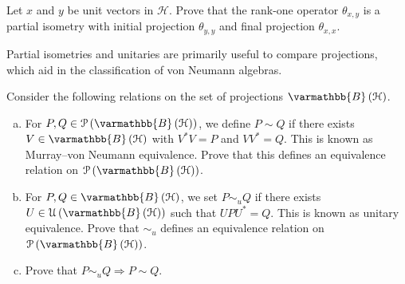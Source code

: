 \documentclass[10pt]{mypackage}
\renewcommand*{\mathbb}[1]{\varmathbb{#1}}
\newcommand{\B}{\mathbb{B}}
\begin{document}
\begin{exercise}
  Let $x$ and $y$ be unit vectors in $\mathcal{H}$. Prove that the rank-one operator $\theta_{x,y}$ is a partial isometry with initial projection $\theta_{y,y}$ and final projection $\theta_{x,x}$.
\end{exercise}
Partial isometries and unitaries are primarily useful to compare projections, which aid in the classification of von Neumann algebras.
\begin{exercise}
  Consider the following relations on the set of projections $\B\left(\mathcal{H}\right)$.
  \begin{enumerate}[(a)]
    \item For $P,Q\in \mathcal{P}\left(\B\left(\mathcal{H}\right)\right)$, we define $P\sim Q$ if there exists $V\in \B\left(\mathcal{H}\right)$ with $V^{\ast}V = P$ and $VV^{\ast} = Q$. This is known as Murray--von Neumann equivalence. Prove that this defines an equivalence relation on $\mathcal{P}\left(\B\left(\mathcal{H}\right)\right)$.
    \item For $P,Q\in \B\left(\mathcal{H}\right)$, we set $P\sim_{u} Q$ if there exists $U\in \mathcal{U}\left(\B\left(\mathcal{H}\right)\right)$ such that $UPU^{\ast} = Q$. This is known as unitary equivalence. Prove that $\sim_{u}$ defines an equivalence relation on $\mathcal{P}\left(\B\left(\mathcal{H}\right)\right)$.
    \item Prove that $P\sim_{u}Q \Rightarrow P\sim Q$.
  \end{enumerate}
\end{exercise}
\end{document}
